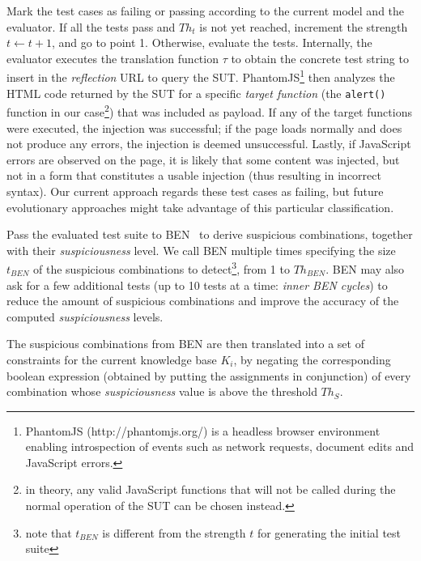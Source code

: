 \begin{tikzborder}{\cite{Gargantini16:validation}}
\begin{tikzborder}{\cite{gargantini_combinatorial_2017}}
\begin{tikzborder}{\cite{gargantini_combinatorial_2017}}
\begin{tikzborder}{\cite{garn2019}}
\begin{inparaenum}
\item  Mark the test cases as failing or passing according to the current model and the evaluator. 
If all the tests pass and $Th_t$ is not yet reached, increment the strength $t \gets t+1$, and go to point 1. 
Otherwise, evaluate the tests.
Internally, the evaluator executes the translation function $\tau$ to obtain the concrete test string to insert in the \textit{reflection} URL to query the SUT. PhantomJS\footnote{PhantomJS (http://phantomjs.org/) is a headless browser environment enabling introspection of events such as network requests, document edits and JavaScript errors.} then analyzes the HTML code returned by the SUT for a specific \textit{target function} (the \texttt{alert()} function in our case\footnote{in theory, any valid JavaScript functions that will not be called during the normal operation of the SUT can be chosen instead.}) that was included as payload. 
If any of the target functions were executed, the injection was successful; if the page loads normally and does not produce any errors, the injection is deemed unsuccessful.
Lastly, if JavaScript errors are observed on the page, it is likely that some content was injected, but not in a form that constitutes a usable injection (thus resulting in incorrect syntax).
Our current approach regards these test cases as failing, but future evolutionary approaches might take advantage of this particular classification.

\item Pass the evaluated test suite to BEN~\cite{ghandehari2018combinatorial} to derive suspicious combinations, together with their \textit{suspiciousness} level.
We call BEN multiple times specifying the size $t_{BEN}$ of the suspicious combinations to detect\footnote{note that $t_{BEN}$ is different from the strength $t$ for generating the initial test suite}, from 1 to $Th_{BEN}$.
BEN may also ask for a few additional tests (up to 10 tests at a time: \emph{inner BEN cycles}) to reduce the amount of suspicious combinations and improve the accuracy of the computed \emph{suspiciousness} levels.

\item The suspicious combinations from BEN are then translated into a set of constraints for the current knowledge base $K_i$, by negating the corresponding boolean expression (obtained by putting the assignments in conjunction) of every combination whose \textit{suspiciousness} value is above the threshold $Th_S$.  


\end{inparaenum}
\end{tikzborder}
\end{tikzborder}
\end{tikzborder}
\end{tikzborder}
